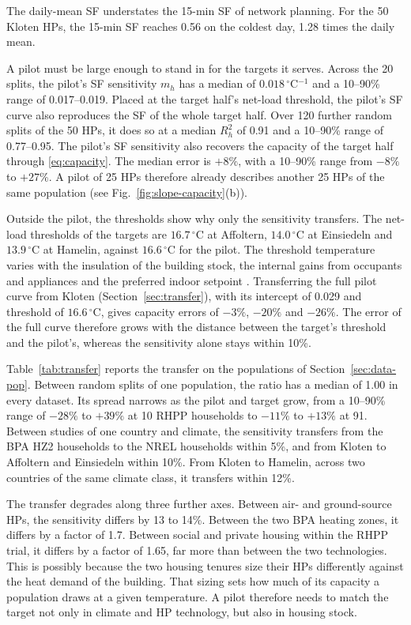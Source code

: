 The daily-mean SF understates the 15-min SF of network planning. For the 50 Kloten HPs, the 15-min SF reaches 0.56 on the coldest day, 1.28 times the daily mean.

A pilot must be large enough to stand in for the targets it serves. Across the 20 splits, the pilot's SF sensitivity $m_h$ has a median of $0.018\,^\circ$C$^{-1}$ and a 10--90\% range of 0.017--0.019. Placed at the target half's net-load threshold, the pilot's SF curve also reproduces the SF of the whole target half. Over 120 further random splits of the 50 HPs, it does so at a median $R^2_h$ of 0.91 and a 10--90\% range of 0.77--0.95. The pilot's SF sensitivity also recovers the capacity of the target half through \eqref{eq:capacity}. The median error is $+8\%$, with a 10--90\% range from $-8\%$ to $+27\%$. A pilot of 25 HPs therefore already describes another 25 HPs of the same population (see Fig.~\ref{fig:slope-capacity}(b)).

Outside the pilot, the thresholds show why only the sensitivity transfers. The net-load thresholds of the targets are $16.7\,^\circ$C at Affoltern, $14.0\,^\circ$C at Einsiedeln and $13.9\,^\circ$C at Hamelin, against $16.6\,^\circ$C for the pilot. The threshold temperature varies with the insulation of the building stock, the internal gains from occupants and appliances and the preferred indoor setpoint \cite{Men18}. Transferring the full pilot curve from Kloten (Section~\ref{sec:transfer}), with its intercept of 0.029 and threshold of $16.6\,^\circ$C, gives capacity errors of $-3\%$, $-20\%$ and $-26\%$. The error of the full curve therefore grows with the distance between the target's threshold and the pilot's, whereas the sensitivity alone stays within 10\%.



Table~\ref{tab:transfer} reports the transfer on the populations of Section~\ref{sec:data-pop}. Between random splits of one population, the ratio has a median of 1.00 in every dataset. Its spread narrows as the pilot and target grow, from a 10--90\% range of $-28\%$ to $+39\%$ at 10 RHPP households to $-11\%$ to $+13\%$ at 91. Between studies of one country and climate, the sensitivity transfers from the BPA HZ2 households to the NREL households within 5\%, and from Kloten to Affoltern and Einsiedeln within 10\%. From Kloten to Hamelin, across two countries of the same climate class, it transfers within 12\%.

The transfer degrades along three further axes. Between air- and ground-source HPs, the sensitivity differs by 13 to 14\%. Between the two BPA heating zones, it differs by a factor of 1.7. Between social and private housing within the RHPP trial, it differs by a factor of 1.65, far more than between the two technologies. This is possibly because the two housing tenures size their HPs differently against the heat demand of the building. That sizing sets how much of its capacity a population draws at a given temperature. A pilot therefore needs to match the target not only in climate and HP technology, but also in housing stock.

